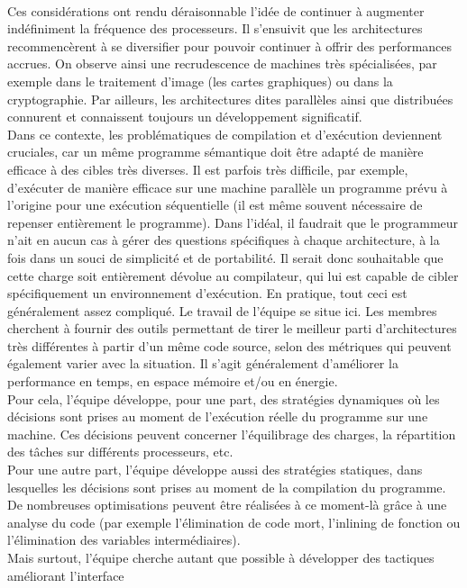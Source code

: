 \documentclass{report}
\begin{document}
\\ Ces considérations ont rendu déraisonnable l'idée de continuer à augmenter indéfiniment la fréquence des 
processeurs. Il s'ensuivit que les architectures recommencèrent à se diversifier pour pouvoir continuer à 
offrir des performances accrues. On observe ainsi une recrudescence de machines très spécialisées, par 
exemple dans le traitement d'image (les cartes graphiques) ou dans la cryptographie. Par ailleurs, les 
architectures dites parallèles ainsi que distribuées connurent et connaissent toujours un développement 
significatif.
\\ Dans ce contexte, les problématiques de compilation et d'exécution deviennent cruciales, car un même 
programme sémantique doit être adapté de manière efficace à des cibles très diverses. Il est parfois 
très difficile, par exemple, d'exécuter de manière efficace sur une machine parallèle un programme
prévu à l'origine pour une exécution séquentielle (il est même souvent nécessaire de repenser 
entièrement le programme). Dans l'idéal, il faudrait que le programmeur n'ait en aucun cas à gérer des 
questions spécifiques à chaque architecture, à la fois dans un souci de simplicité et de portabilité.
Il serait donc souhaitable que cette charge soit entièrement dévolue au compilateur, qui lui est 
capable de cibler spécifiquement un environnement d'exécution. En pratique, tout ceci est généralement 
assez compliqué. Le travail de l'équipe se situe ici. Les membres cherchent à fournir des outils
permettant de tirer le meilleur parti d'architectures très différentes à partir d'un même code source, 
selon des métriques qui peuvent également varier avec la situation. Il s'agit généralement d'améliorer 
la performance en temps, en espace mémoire et/ou en énergie.
\\ Pour cela, l'équipe développe, pour une part, des stratégies dynamiques où les décisions sont prises au
moment de l'exécution réelle du programme sur une machine. Ces décisions peuvent concerner l'équilibrage
des charges, la répartition des tâches sur différents processeurs, etc.
\\Pour une autre part, l'équipe développe aussi des stratégies statiques, dans lesquelles les décisions
sont prises au moment de la compilation du programme. De nombreuses optimisations peuvent être réalisées
à ce moment-là grâce à une analyse du code (par exemple l'élimination de code mort, l'inlining de fonction
ou l'élimination des variables intermédiaires).
\\Mais surtout, l'équipe cherche autant que possible à développer des tactiques améliorant l'interface
\end{document}
